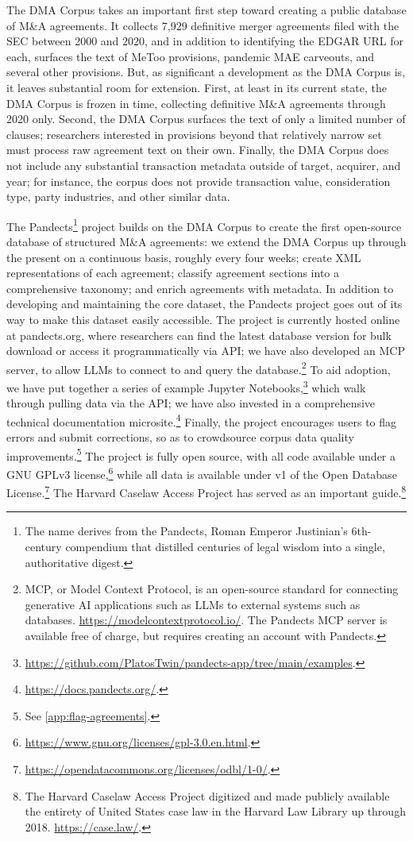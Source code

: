 \documentclass[12pt]{article}
\begin{document}
The DMA Corpus takes an important first step toward creating a public database of M\&A agreements. It collects 7,929 definitive merger agreements filed with the SEC between 2000 and 2020, and in addition to identifying the EDGAR URL for each, surfaces the text of MeToo provisions, pandemic MAE carveouts, and several other provisions. But, as significant a development as the DMA Corpus is, it leaves substantial room for extension. First, at least in its current state, the DMA Corpus is frozen in time, collecting definitive M\&A agreements through 2020 only. Second, the DMA Corpus surfaces the text of only a limited number of clauses; researchers interested in provisions beyond that relatively narrow set must process raw agreement text on their own. Finally, the DMA Corpus does not include any substantial transaction metadata outside of target, acquirer, and year; for instance, the corpus does not provide transaction value, consideration type, party industries, and other similar data.

The Pandects\footnote{The name derives from the Pandects, Roman Emperor Justinian's 6th-century compendium that distilled centuries of legal wisdom into a single, authoritative digest.} project builds on the DMA Corpus to create the first open-source database of structured M\&A agreements: we extend the DMA Corpus up through the present on a continuous basis, roughly every four weeks; create XML representations of each agreement; classify agreement sections into a comprehensive taxonomy; and enrich agreements with metadata. In addition to developing and maintaining the core dataset, the Pandects project goes out of its way to make this dataset easily accessible. The project is currently hosted online at pandects.org, where researchers can find the latest database version for bulk download or access it programmatically via API; we have also developed an MCP server, to allow LLMs to connect to and query the database.\footnote{MCP, or Model Context Protocol, is an open-source standard for connecting generative AI applications such as LLMs to external systems such as databases. \url{https://modelcontextprotocol.io/}. The Pandects MCP server is available free of charge, but requires creating an account with Pandects.} To aid adoption, we have put together a series of example Jupyter Notebooks,\footnote{\url{https://github.com/PlatosTwin/pandects-app/tree/main/examples}.} which walk through pulling data via the API; we have also invested in a comprehensive technical documentation microsite.\footnote{\url{https://docs.pandects.org/}.} Finally, the project encourages users to flag errors and submit corrections, so as to crowdsource corpus data quality improvements.\footnote{See \autoref{app:flag-agreements}.} The project is fully open source, with all code available under a GNU GPLv3 license,\footnote{\url{https://www.gnu.org/licenses/gpl-3.0.en.html}.} while all data is available under v1 of the Open Database License.\footnote{\url{https://opendatacommons.org/licenses/odbl/1-0/}.} The Harvard Caselaw Access Project has served as an important guide.\footnote{The Harvard Caselaw Access Project digitized and made publicly available the entirety of United States case law in the Harvard Law Library up through 2018. \url{https://case.law/}.}
\end{document}
